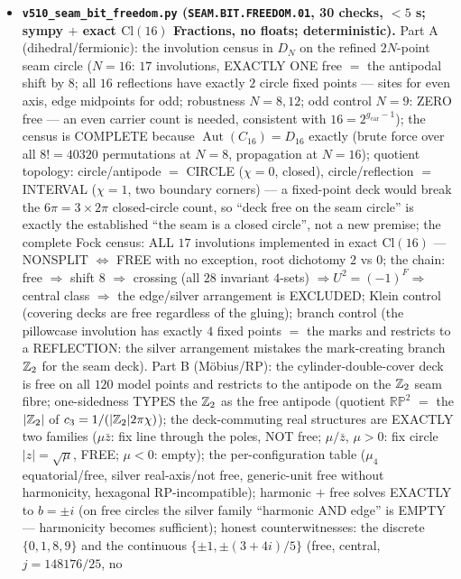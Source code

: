\documentclass[11pt]{article}
\providecommand{\cthree}{c_3}\providecommand{\phiz}{\varphi_0^{\mathrm{ret}}}
\providecommand{\gcar}{g_{\mathrm{car}}}\providecommand{\Nfam}{N_{\mathrm{fam}}}
\providecommand{\Aut}{\operatorname{Aut}}
\begin{document}
\begin{itemize}[leftmargin=1.5em]
\item \textbf{\texttt{v510\_seam\_bit\_freedom.py} (\texttt{SEAM.BIT.FREEDOM.01}, 30 checks, $<5$ s;
sympy $+$ exact $\mathrm{Cl}(16)$ Fractions, no floats; deterministic).} Part A (dihedral/fermionic):
the involution census in $D_N$ on the refined $2N$-point seam circle ($N=16$: $17$ involutions,
EXACTLY ONE free $=$ the antipodal shift by $8$; all $16$ reflections have exactly $2$ circle fixed
points --- sites for even axis, edge midpoints for odd; robustness $N=8,12$; odd control $N=9$: ZERO
free --- an even carrier count is needed, consistent with $16=2^{\gcar-1}$); the census is COMPLETE
because $\Aut(C_{16})=D_{16}$ exactly (brute force over all $8!=40320$ permutations at $N=8$,
propagation at $N=16$); quotient topology: circle/antipode $=$ CIRCLE ($\chi=0$, closed),
circle/reflection $=$ INTERVAL ($\chi=1$, two boundary corners) --- a fixed-point deck would break
the $6\pi=3\times2\pi$ closed-circle count, so ``deck free on the seam circle'' is exactly the
established ``the seam is a closed circle'', not a new premise; the complete Fock census: ALL $17$
involutions implemented in exact $\mathrm{Cl}(16)$ --- NONSPLIT $\iff$ FREE with no exception, root
dichotomy $2$ vs $0$; the chain: free $\Rightarrow$ shift $8$ $\Rightarrow$ crossing (all $28$
invariant $4$-sets) $\Rightarrow U^2=(-1)^F\Rightarrow$ central class $\Rightarrow$ the edge/silver
arrangement is EXCLUDED; Klein control (covering decks are free regardless of the gluing); branch
control (the pillowcase involution has exactly $4$ fixed points $=$ the marks and restricts to a
REFLECTION: the silver arrangement mistakes the mark-creating branch $\mathbb{Z}_2$ for the seam deck).
Part B (M\"obius/RP): the cylinder-double-cover deck is free on all $120$ model points and restricts
to the antipode on the $\mathbb{Z}_2$ seam fibre; one-sidedness TYPES the $\mathbb{Z}_2$ as the free antipode
(quotient $\mathbb{RP}^2$ $=$ the $|\mathbb{Z}_2|$ of $\cthree=1/(|\Z_2|2\pi\chi)$); the deck-commuting real
structures are EXACTLY two families ($\mu\bar z$: fix line through the poles, NOT free; $\mu/\bar z$,
$\mu>0$: fix circle $|z|=\sqrt\mu$, FREE; $\mu<0$: empty); the per-configuration table ($\mu_4$
equatorial/free, silver real-axis/not free, generic-unit free without harmonicity, hexagonal
RP-incompatible); harmonic $+$ free solves EXACTLY to $b=\pm i$ (on free circles the silver family
``harmonic AND edge'' is EMPTY --- harmonicity becomes sufficient); honest counterwitnesses: the
discrete $\{0,1,8,9\}$ and the continuous $\{\pm1,\pm(3{+}4i)/5\}$ (free, central, $j=148176/25$, no

\end{itemize}
\end{document}
